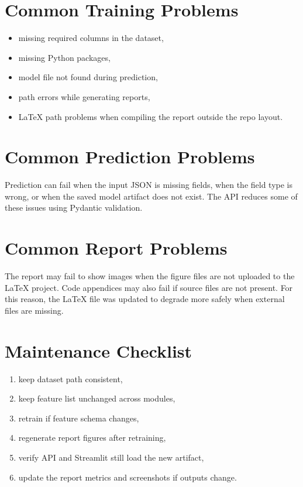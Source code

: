 \documentclass[12pt,a4paper,openany]{report}
\begin{document}
    \section{Common Training Problems}
    \begin{itemize}[leftmargin=1.4cm]
    \item missing required columns in the dataset,
    \item missing Python packages,
    \item model file not found during prediction,
    \item path errors while generating reports,
    \item LaTeX path problems when compiling the report outside the repo layout.
    \end{itemize}

    \section{Common Prediction Problems}
    Prediction can fail when the input JSON is missing fields, when the field type is wrong, or when the saved model artifact does not exist. The API reduces some of these issues using Pydantic validation.

    \section{Common Report Problems}
    The report may fail to show images when the figure files are not uploaded to the LaTeX project. Code appendices may also fail if source files are not present. For this reason, the LaTeX file was updated to degrade more safely when external files are missing.

    \section{Maintenance Checklist}
    \begin{enumerate}[leftmargin=1.4cm]
    \item keep dataset path consistent,
    \item keep feature list unchanged across modules,
    \item retrain if feature schema changes,
    \item regenerate report figures after retraining,
    \item verify API and Streamlit still load the new artifact,
    \item update the report metrics and screenshots if outputs change.
    \end{enumerate}
\end{document}
